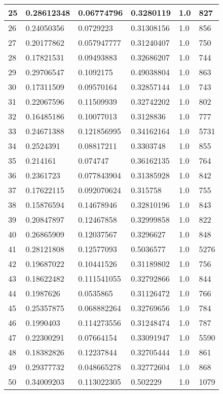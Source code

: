 \begin{longtable}{|l|l|l|l|l|l|}
25 & 0.28612348 & 0.06774796 & 0.3280119 & 1.0 & 827 \\ \hline 
26 & 0.24050356 & 0.0729223 & 0.31308156 & 1.0 & 856 \\ \hline 
27 & 0.20177862 & 0.057947777 & 0.31240407 & 1.0 & 750 \\ \hline 
28 & 0.17821531 & 0.09493883 & 0.32686207 & 1.0 & 744 \\ \hline 
29 & 0.29706547 & 0.1092175 & 0.49038804 & 1.0 & 863 \\ \hline 
30 & 0.17311509 & 0.09570164 & 0.32857144 & 1.0 & 743 \\ \hline 
31 & 0.22067596 & 0.11509939 & 0.32742202 & 1.0 & 802 \\ \hline 
32 & 0.16485186 & 0.10077013 & 0.3128836 & 1.0 & 777 \\ \hline 
33 & 0.24671388 & 0.121856995 & 0.34162164 & 1.0 & 5731 \\ \hline 
34 & 0.2524391 & 0.08817211 & 0.3303748 & 1.0 & 855 \\ \hline 
35 & 0.214161 & 0.074747 & 0.36162135 & 1.0 & 764 \\ \hline 
36 & 0.2361723 & 0.077843904 & 0.31385928 & 1.0 & 842 \\ \hline 
37 & 0.17622115 & 0.092070624 & 0.315758 & 1.0 & 755 \\ \hline 
38 & 0.15876594 & 0.14678946 & 0.32810196 & 1.0 & 843 \\ \hline 
39 & 0.20847897 & 0.12467858 & 0.32999858 & 1.0 & 822 \\ \hline 
40 & 0.26865909 & 0.12037567 & 0.3296627 & 1.0 & 848 \\ \hline 
41 & 0.28121808 & 0.12577093 & 0.5036577 & 1.0 & 5276 \\ \hline 
42 & 0.19687022 & 0.10441526 & 0.31189802 & 1.0 & 756 \\ \hline 
43 & 0.18622482 & 0.111541055 & 0.32792866 & 1.0 & 844 \\ \hline 
44 & 0.1987626 & 0.0535865 & 0.31126472 & 1.0 & 766 \\ \hline 
45 & 0.25357875 & 0.068882264 & 0.32769656 & 1.0 & 784 \\ \hline 
46 & 0.1990403 & 0.114273556 & 0.31248474 & 1.0 & 787 \\ \hline 
47 & 0.22300291 & 0.07664154 & 0.33091947 & 1.0 & 5590 \\ \hline 
48 & 0.18382826 & 0.12237844 & 0.32705444 & 1.0 & 861 \\ \hline 
49 & 0.29377732 & 0.048665278 & 0.32772604 & 1.0 & 868 \\ \hline 
50 & 0.34009203 & 0.113022305 & 0.502229 & 1.0 & 1079 \\ \hline 
\end{longtable}
